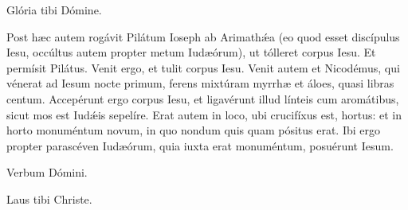 \rubricatum{\Rbardot{}} Glória tibi Dómine.

Post hæc autem rogávit Pilátum Ioseph ab Arimathǽa (eo quod esset discípulus 
Iesu, occúltus autem propter metum Iudæórum), ut tólleret corpus Iesu.
Et permísit Pilátus. Venit ergo, et tulit corpus Iesu.
Venit autem et Nicodémus, qui vénerat ad Iesum nocte primum, ferens 
mixtúram myrrhæ et áloes, quasi libras centum. Accepérunt ergo corpus Iesu,
et ligavérunt illud línteis cum aromátibus, sicut mos est Iudǽis sepelíre.
Erat autem in loco, ubi crucifíxus est, hortus: et in horto monuméntum
novum, in quo nondum quis quam pósitus erat. Ibi ergo propter parascéven
Iudæórum, quia iuxta erat monuméntum, posuérunt Iesum.

Verbum Dómini.

\rubricatum{\Rbardot{}} Laus tibi Christe.
